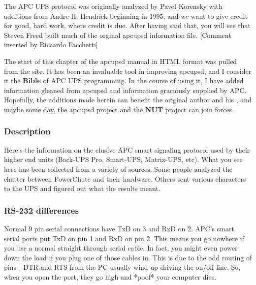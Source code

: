 {{{{{{{{{{{{{{{{{\label{index-Smart-protocol-262}
\label{index-Protocol-Smart-263}
The APC UPS protocol was originally analyzed by Pavel Korensky with additions
from Andre H. Hendrick beginning in 1995, and we want to give credit for good,
hard work, where credit is due. After having said that, you will see that
Steven Freed built much of the orginal apcupsd information file. [Comment
inserted by Riccardo Facchetti]  

The start of this chapter of the apcupsd manual in HTML format was pulled from
the 
 site. It has been an
invaluable tool in improving apcupsd, and I consider it the {\bf Bible} of APC
UPS programming. In the course of using it, I have added information gleaned
from apcupsd and information graciously supplied by APC. Hopefully, the
additions made herein can benefit the original author and his 
, and maybe some day,
the apcupsd project and the {\bf NUT} project can join forces. 

\label{Description}

\subsubsection*{Description}

Here's the information on the elusive APC smart signaling protocol used by
their higher end units (Back-UPS Pro, Smart-UPS, Matrix-UPS, etc). What you
see here has been collected from a variety of sources. Some people analyzed
the chatter between PowerChute and their hardware. Others sent various
characters to the UPS and figured out what the results meant. 

\label{RS_002d232-differences}

\subsubsection*{RS-232 differences}

Normal 9 pin serial connections have TxD on 3 and RxD on 2. APC's smart serial
ports put TxD on pin 1 and RxD on pin 2. This means you go nowhere if you use
a normal straight through serial cable. In fact, you might even power down the
load if you plug one of those cables in. This is due to the odd routing of
pins - DTR and RTS from the PC usually wind up driving the on/off line. So,
when you open the port, they go high and *poof* your computer dies.  

}}}}}}}}}}}}}}}}}

